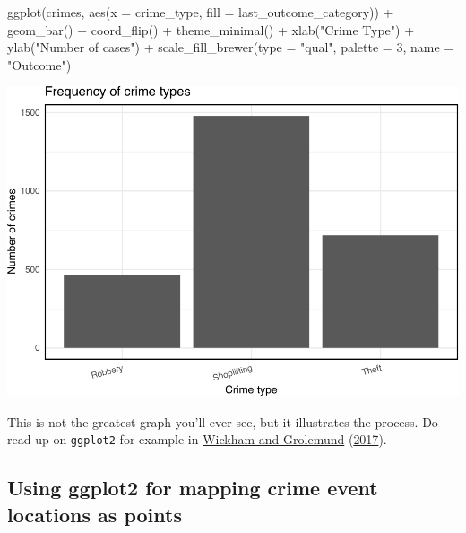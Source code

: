 \documentclass[
]{book}
\newenvironment{Shaded}{\begin{snugshade}}{\end{snugshade}}
\newcommand{\AttributeTok}[1]{\textcolor[rgb]{0.77,0.63,0.00}{#1}}
\newcommand{\DecValTok}[1]{\textcolor[rgb]{0.00,0.00,0.81}{#1}}
\newcommand{\FunctionTok}[1]{\textcolor[rgb]{0.00,0.00,0.00}{#1}}
\newcommand{\NormalTok}[1]{#1}
\newcommand{\SpecialCharTok}[1]{\textcolor[rgb]{0.00,0.00,0.00}{#1}}
\newcommand{\StringTok}[1]{\textcolor[rgb]{0.31,0.60,0.02}{#1}}
\begin{document}
\begin{Shaded}
\begin{Highlighting}[]
\FunctionTok{ggplot}\NormalTok{(crimes, }\FunctionTok{aes}\NormalTok{(}\AttributeTok{x =}\NormalTok{ crime\_type, }\AttributeTok{fill =}\NormalTok{ last\_outcome\_category)) }\SpecialCharTok{+} \FunctionTok{geom\_bar}\NormalTok{() }\SpecialCharTok{+} 
    \FunctionTok{coord\_flip}\NormalTok{() }\SpecialCharTok{+} \FunctionTok{theme\_minimal}\NormalTok{() }\SpecialCharTok{+} \FunctionTok{xlab}\NormalTok{(}\StringTok{"Crime Type"}\NormalTok{) }\SpecialCharTok{+} \FunctionTok{ylab}\NormalTok{(}\StringTok{"Number of cases"}\NormalTok{) }\SpecialCharTok{+} 
    \FunctionTok{scale\_fill\_brewer}\NormalTok{(}\AttributeTok{type =} \StringTok{"qual"}\NormalTok{, }\AttributeTok{palette =} \DecValTok{3}\NormalTok{, }\AttributeTok{name =} \StringTok{"Outcome"}\NormalTok{)}
\end{Highlighting}
\end{Shaded}

\includegraphics{crime_mapping_files/figure-latex/unnamed-chunk-6-1.pdf}

This is not the greatest graph you'll ever see, but it illustrates the process. Do read up on \texttt{ggplot2} for example in \protect\hyperlink{ref-Wickham_2017}{Wickham and Grolemund} (\protect\hyperlink{ref-Wickham_2017}{2017}).

\hypertarget{using-ggplot2-for-mapping-crime-event-locations-as-points}{%
\subsection{Using ggplot2 for mapping crime event locations as points}\label{using-ggplot2-for-mapping-crime-event-locations-as-points}}
\end{document}
